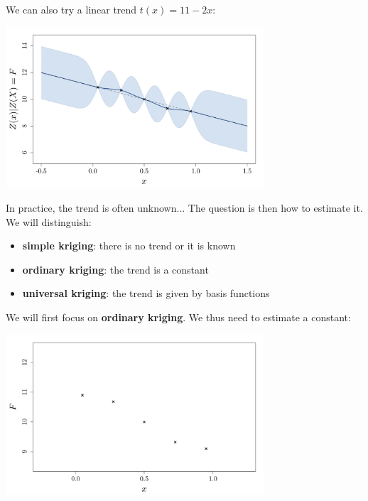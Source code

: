 \documentclass{beamer}
\begin{document}
\begin{frame}{}
We can also try a linear trend $t(x)=11-2x$:
\begin{center}
	\includegraphics[height=6cm]{figures/R/trend_knownlin}
\end{center}
\end{frame}

\begin{frame}{}
In practice, the trend is often unknown... The question is then how to estimate it.\\ \vspace{5mm} 
We will distinguish:
\begin{itemize}
	\item \textbf{simple kriging}: there is no trend or it is known
	\item \textbf{ordinary kriging}: the trend is a constant
	\item \textbf{universal kriging}: the trend is given by basis functions
\end{itemize}
\end{frame}

\begin{frame}{}
We will first focus on \textbf{ordinary kriging}. We thus need to estimate a constant:\\ \vspace{5mm} 
\begin{center}
	\includegraphics[height=6cm]{figures/R/trend_dataordinary}
\end{center}
\end{frame}
\end{document}
